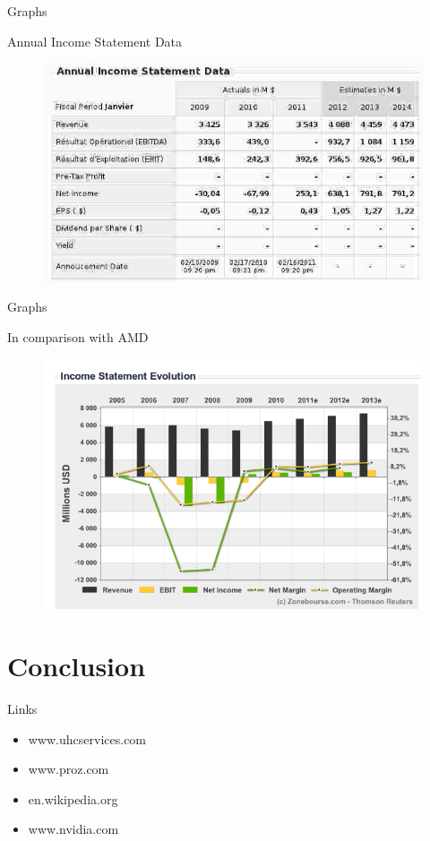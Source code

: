 \documentclass{beamer}
\begin{document}
\begin{frame}{Graphs}
	\begin{block}{Annual Income Statement Data}
		\begin{figure}[h]
			\includegraphics[width=0.90\textheight]{images/Annual_Income_SD_NVIDIA.jpeg}
		\end{figure}
	\end{block}	
\end{frame}

\begin{frame}{Graphs}
	\begin{block}{In comparison with AMD}
		\begin{figure}[h]
			\includegraphics[width=0.90\textheight]{images/Income_Statement_Evolution_amd.png}
		\end{figure}
	\end{block}	
\end{frame}

\section{Conclusion}
\begin{frame}{Links}
	\begin{itemize}
		\item<+->{www.uhcservices.com}
		\item<+->{www.proz.com}
		\item<+->{en.wikipedia.org}
		\item<+->{www.nvidia.com}
	\end{itemize}
\end{frame}
\end{document}
